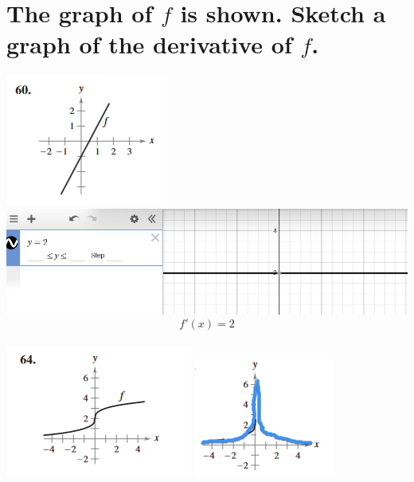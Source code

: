 \documentclass[11pt]{article}
\begin{document}
\section{The graph of $f$ is shown. Sketch a graph of the derivative of $f$.}
\includegraphics{60a.png}
\includegraphics[scale=0.5]{60b.png}\\
\[f'(x)=2\]\\

\includegraphics{64.png}
\includegraphics{64b.png}
\end{document}
